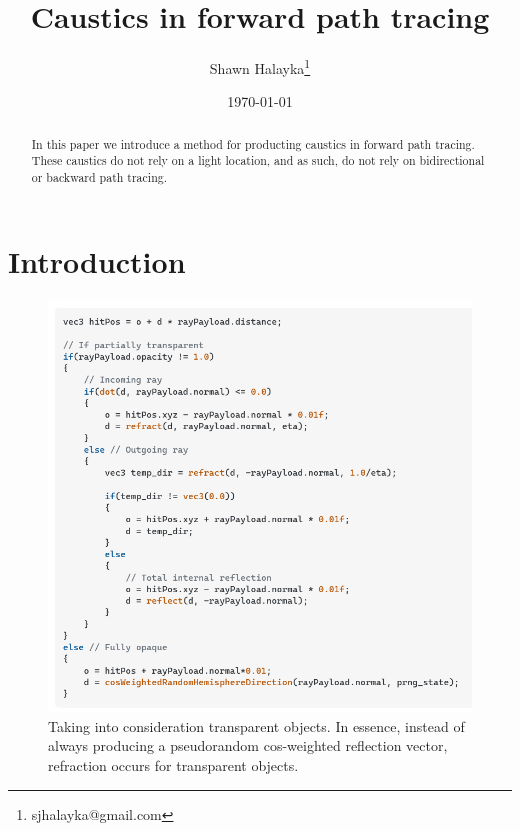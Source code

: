 \documentclass[12pt]{article}
\title{Caustics in forward path tracing}
\author{
Shawn Halayka\footnote{sjhalayka@gmail.com}
}
\date{\today\;\currenttime}
\begin{document}
\newcommand{\abs}[1]{\lvert#1\rvert}



\maketitle




\begin{abstract}
In this paper we introduce a method for producting caustics in forward path tracing.
These caustics do not rely on a light location, and as such, do not rely on bidirectional or backward path tracing.
\end{abstract}

\section{Introduction}




\begin{figure} 
\centering
  \includegraphics[width = 6 in]{code.png}
  \caption{ Taking into consideration transparent objects.
In essence, instead of always producing a pseudorandom cos-weighted reflection vector, refraction occurs for transparent objects.
}
\end{figure}
\end{document}
